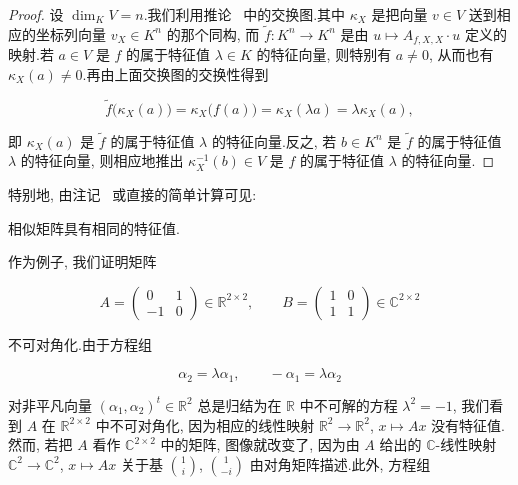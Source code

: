 \begin{proof}
设 $\dim_K V = n$.我们利用推论~ 中的交换图.其中 $\kappa_X$ 是把向量 $v \in V$ 送到相应的坐标列向量 $v_X \in K^n$ 的那个同构, 而 $\tilde{f} \colon K^n \longrightarrow K^n$ 是由 $u \longmapsto A_{f, X, X} \cdot u$ 定义的映射.若 $a \in V$ 是 $f$ 的属于特征值 $\lambda \in K$ 的特征向量, 则特别有 $a \neq 0$, 从而也有 $\kappa_X(a) \neq 0$.再由上面交换图的交换性得到

\begin{center}
\end{center}

\[
\tilde{f}\big(\kappa_X(a)\big) = \kappa_X\big(f(a)\big) = \kappa_X(\lambda a) = \lambda \kappa_X(a),\]

即 $\kappa_X(a)$ 是 $\tilde{f}$ 的属于特征值 $\lambda$ 的特征向量.反之, 若 $b \in K^n$ 是 $\tilde{f}$ 的属于特征值 $\lambda$ 的特征向量, 则相应地推出 $\kappa_X^{-1}(b) \in V$ 是 $f$ 的属于特征值 $\lambda$ 的特征向量.
\end{proof}

特别地, 由注记~ 或直接的简单计算可见:

\begin{remark}[相似矩阵具有相同的特征值]\label{rem:6.1.7}
相似矩阵具有相同的特征值.
\end{remark}

作为例子, 我们证明矩阵

\[
A = \left(\begin{array}{cc} 0 & 1 \\ -1 & 0 \end{array}\right) \in \mathbb{R}^{2 \times 2}, \qquad B = \left(\begin{array}{cc} 1 & 0 \\ 1 & 1 \end{array}\right) \in \mathbb{C}^{2 \times 2}\]

不可对角化.由于方程组

\[
\alpha_2 = \lambda \alpha_1, \qquad -\alpha_1 = \lambda \alpha_2\]

对非平凡向量 $(\alpha_1, \alpha_2)^t \in \mathbb{R}^2$ 总是归结为在 $\mathbb{R}$ 中不可解的方程 $\lambda^2 = -1$, 我们看到 $A$ 在 $\mathbb{R}^{2 \times 2}$ 中不可对角化, 因为相应的线性映射 $\mathbb{R}^2 \longrightarrow \mathbb{R}^2$, $x \longmapsto Ax$ 没有特征值.然而, 若把 $A$ 看作 $\mathbb{C}^{2 \times 2}$ 中的矩阵, 图像就改变了, 因为由 $A$ 给出的 $\mathbb{C}$-线性映射 $\mathbb{C}^2 \longrightarrow \mathbb{C}^2$, $x \longmapsto Ax$ 关于基 $\binom{1}{i}$, $\binom{1}{-i}$ 由对角矩阵描述.此外, 方程组

